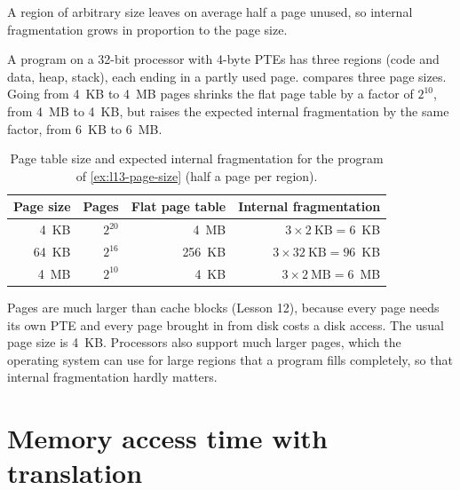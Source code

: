 \documentclass[../main.tex]{subfiles}
\begin{document}
A region of arbitrary size leaves on average half a page unused, so internal
fragmentation grows in proportion to the page size.

\begin{example}
  \label{ex:l13-page-size}
  A program on a 32-bit processor with 4-byte PTEs has three regions (code and
  data, heap, stack), each ending in a partly used page.
   compares three page sizes.  Going from 4~KB to 4~MB
  pages shrinks the flat page table by a factor of $2^{10}$, from 4~MB to
  4~KB, but raises the expected internal fragmentation by the same factor,
  from 6~KB to 6~MB.
\end{example}

\begin{table}[htbp]
  \centering\small
  \caption{Page table size and expected internal fragmentation for the program
    of \cref{ex:l13-page-size} (half a page per region).}
  \label{tab:l13-page-size}
  \begin{tabular}{@{}rrrr@{}}
    \toprule
    Page size & Pages & Flat page table & Internal fragmentation \\
    \midrule
    4~KB  & $2^{20}$ & 4~MB   & $3 \times 2~\text{KB} = 6$~KB \\
    64~KB & $2^{16}$ & 256~KB & $3 \times 32~\text{KB} = 96$~KB \\
    4~MB  & $2^{10}$ & 4~KB   & $3 \times 2~\text{MB} = 6$~MB \\
    \bottomrule
  \end{tabular}
\end{table}

Pages are much larger than cache blocks (Lesson 12), because every page needs
its own PTE and every page brought in from disk costs a disk access.  The usual
page size is 4~KB.  Processors also support much larger pages, which the
operating system can use for large regions that a program fills completely,
so that internal fragmentation hardly matters.

\section{Memory access time with translation}
\label{sec:l13-access-time}
\end{document}
